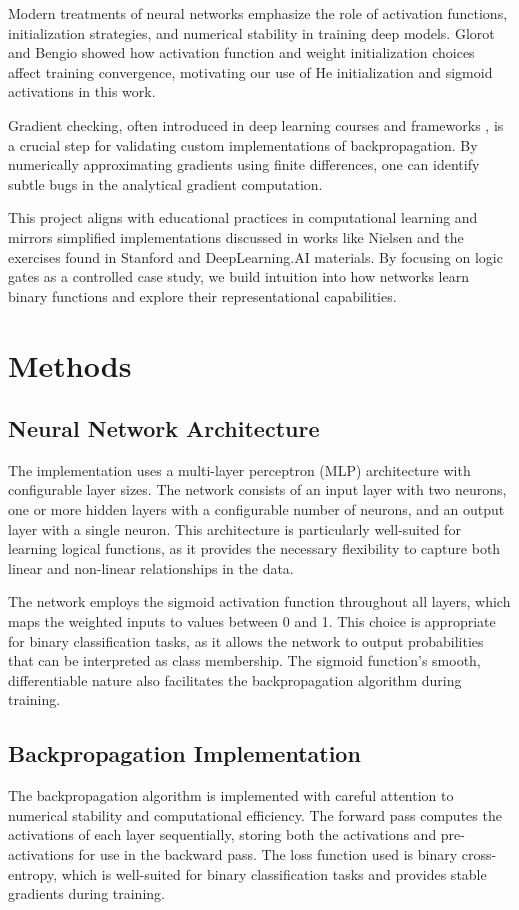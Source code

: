 \documentclass[11pt,a4paper]{article}
\begin{document}
Modern treatments of neural networks emphasize the role of activation functions, initialization strategies, and numerical stability in training deep models. Glorot and Bengio \cite{pmlr-v9-glorot10a} showed how activation function and weight initialization choices affect training convergence, motivating our use of He initialization and sigmoid activations in this work.

Gradient checking, often introduced in deep learning courses and frameworks \cite{ng2017deep}, is a crucial step for validating custom implementations of backpropagation. By numerically approximating gradients using finite differences, one can identify subtle bugs in the analytical gradient computation.

This project aligns with educational practices in computational learning and mirrors simplified implementations discussed in works like Nielsen \cite{nielsen2015neural} and the exercises found in Stanford and DeepLearning.AI materials. By focusing on logic gates as a controlled case study, we build intuition into how networks learn binary functions and explore their representational capabilities.

\section{Methods}
\label{sec:methods}
\subsection{Neural Network Architecture}
The implementation uses a multi-layer perceptron (MLP) architecture with configurable layer sizes. The network consists of an input layer with two neurons, one or more hidden layers with a configurable number of neurons, and an output layer with a single neuron. This architecture is particularly well-suited for learning logical functions, as it provides the necessary flexibility to capture both linear and non-linear relationships in the data.

The network employs the sigmoid activation function throughout all layers, which maps the weighted inputs to values between 0 and 1. This choice is appropriate for binary classification tasks, as it allows the network to output probabilities that can be interpreted as class membership. The sigmoid function's smooth, differentiable nature also facilitates the backpropagation algorithm during training.

\subsection{Backpropagation Implementation}
The backpropagation algorithm is implemented with careful attention to numerical stability and computational efficiency. The forward pass computes the activations of each layer sequentially, storing both the activations and pre-activations for use in the backward pass. The loss function used is binary cross-entropy, which is well-suited for binary classification tasks and provides stable gradients during training.
\end{document}
